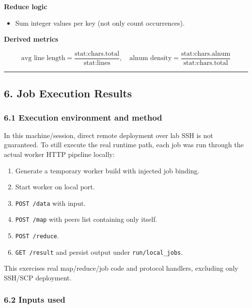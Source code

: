 \documentclass[
]{article}
\providecommand{\tightlist}{%
  \setlength{\itemsep}{0pt}\setlength{\parskip}{0pt}}
\begin{document}
\pagebreak
\textbf{Reduce logic}

\begin{itemize}
\tightlist
\item
  Sum integer values per key (not only count occurrences).
\end{itemize}

\textbf{Derived metrics}

\[
    \text{avg line length} = \frac{\text{stat:chars.total}}{\text{stat:lines}},\quad
    \text{alnum density} = \frac{\text{stat:chars.alnum}}{\text{stat:chars.total}}
\]

\begin{center}\rule{0.5\linewidth}{0.5pt}\end{center}

\subsection{6. Job Execution Results}\label{job-execution-results}

\subsubsection{6.1 Execution environment and
method}\label{execution-environment-and-method}

In this machine/session, direct remote deployment over lab SSH is not
guaranteed. To still execute the real runtime path, each job was run
through the actual worker HTTP pipeline locally:

\begin{enumerate}
\def\labelenumi{\arabic{enumi}.}
\tightlist
\item
  Generate a temporary worker build with injected job binding.
\item
  Start worker on local port.
\item
  \texttt{POST\ /data} with input.
\item
  \texttt{POST\ /map} with peers list containing only itself.
\item
  \texttt{POST\ /reduce}.
\item
  \texttt{GET\ /result} and persist output under
  \texttt{run/local\_jobs}.
\end{enumerate}

This exercises real map/reduce/job code and protocol handlers, excluding
only SSH/SCP deployment.

\subsubsection{6.2 Inputs used}\label{inputs-used}
\end{document}
